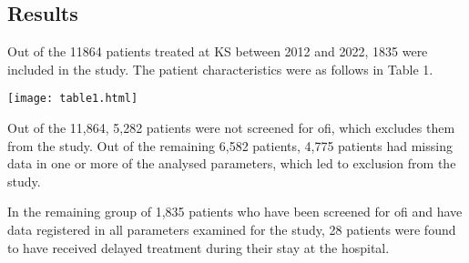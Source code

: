 \documentclass[
]{article}
\begin{document}
\hypertarget{results}{%
\subsection{Results}\label{results}}

Out of the 11864 patients treated at KS between 2012 and 2022, 1835 were
included in the study. The patient characteristics were as follows in
Table 1.

\texttt{[image: table1.html]}

Out of the 11,864, 5,282 patients were not screened for ofi, which
excludes them from the study. Out of the remaining 6,582 patients, 4,775
patients had missing data in one or more of the analysed parameters,
which led to exclusion from the study.

In the remaining group of 1,835 patients who have been screened for ofi
and have data registered in all parameters examined for the study, 28
patients were found to have received delayed treatment during their stay
at the hospital.
\end{document}
